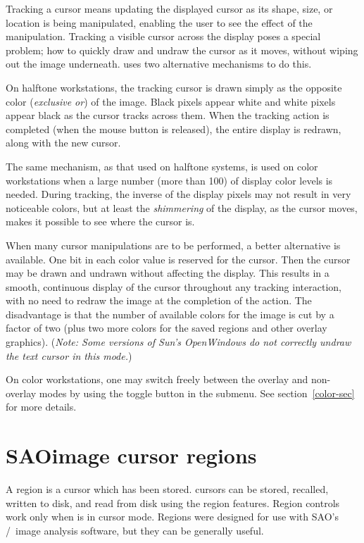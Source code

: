 Tracking a cursor means updating the displayed cursor as its shape, size,
or location is being manipulated, enabling the user to see the effect of
the manipulation.  Tracking a visible cursor across the display poses a
special problem; how to quickly draw and undraw the cursor as it moves,
without wiping out the image underneath.  {\SAO} uses two alternative
mechanisms to do this.

On halftone workstations, the tracking cursor is drawn simply as the
opposite color ({\em exclusive or}) of the image.  Black pixels appear white
and white pixels appear black as the cursor tracks across them.
When the tracking action is completed (when the mouse button is
released), the entire display is redrawn, along with the new cursor.

The same mechanism, as that used on halftone systems, is used on color
workstations when a large number (more than 100) of display color levels is
needed.  During tracking, the inverse of the display pixels may not result
in very noticeable colors, but at least the {\em shimmering} of the display,
as the cursor moves, makes it possible to see where the cursor is.

When many cursor manipulations are to be performed, a better alternative is
available.  One bit in each color value is reserved for the cursor.  Then
the cursor may be drawn and undrawn without affecting the display.  This
results in a smooth, continuous display of the cursor throughout any
tracking interaction, with no need to redraw the image at the completion
of the action.  The disadvantage is that the number of available colors
for the image is cut by a factor of two (plus two more colors for the
saved regions and other overlay graphics).  ({\em Note: Some versions of
Sun's OpenWindows do not correctly undraw the text cursor in this mode.})

On color workstations, one may switch freely between the overlay and
non-overlay modes by using the  toggle button in the  submenu.
See section~\ref{color-sec} for more details.

\section{ SAOimage cursor regions } \label{reg-sec}

A region is a cursor which has been stored.  {\SAO} cursors can be
stored, recalled, written to disk, and read from disk using the
region features.  Region controls work only when {\SAO} is in
cursor mode.  Regions were designed for use with SAO's \PROS/\IRAF\ image
analysis software, but they can be generally useful.

